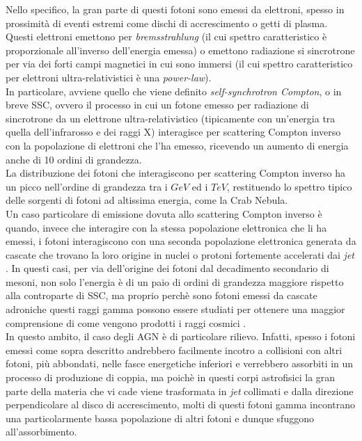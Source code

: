 \documentclass[10pt]{article}
\begin{document}
Nello specifico, la gran parte di questi fotoni sono emessi da elettroni, spesso in prossimità di eventi estremi come dischi di accrescimento o getti di plasma. Questi elettroni emettono per \textit{bremsstrahlung} (il cui spettro caratteristico è proporzionale all'inverso dell'energia emessa) o emettono radiazione si sincrotrone per via dei forti campi magnetici in cui sono immersi (il cui spettro caratteristico per elettroni ultra-relativistici è una \textit{power-law}).
\\
In particolare, avviene quello che viene definito \textit{self-synchrotron Compton}, o in breve SSC, ovvero il processo in cui un fotone emesso per radiazione di sincrotrone da un elettrone ultra-relativistico (tipicamente con un'energia tra quella dell'infrarosso e dei raggi X) interagisce per scattering Compton inverso con la popolazione di elettroni che l'ha emesso, ricevendo un aumento di energia anche di 10 ordini di grandezza.
\\
La distribuzione dei fotoni che interagiscono per scattering Compton inverso ha un picco nell'ordine di grandezza tra i $ \unit{GeV} $ ed i $ \unit{TeV} $, restituendo lo spettro tipico delle sorgenti di fotoni ad altissima energia, come la Crab Nebula.
\\
Un caso particolare di emissione dovuta allo scattering Compton inverso è quando, invece che interagire con la stessa popolazione elettronica che li ha emessi, i fotoni interagiscono con una seconda popolazione elettronica generata da cascate che trovano la loro origine in nuclei o protoni fortemente accelerati dai \textit{jet} \cite{grBLLAC}.
In questi casi, per via dell'origine dei fotoni dal decadimento secondario di mesoni, non solo l'energia è di un paio di ordini di grandezza maggiore rispetto alla controparte di SSC, ma proprio perchè sono fotoni emessi da cascate adroniche questi raggi gamma possono essere studiati per ottenere una maggior comprensione di come vengono prodotti i raggi cosmici \cite{VHEGA}.
\\
In questo ambito, il caso degli AGN è di particolare rilievo. Infatti, spesso i fotoni emessi come sopra descritto andrebbero facilmente incotro a collisioni con altri fotoni, più abbondati, nelle fasce energetiche inferiori e verrebbero assorbiti in un processo di produzione di coppia, ma poichè in questi corpi astrofisici la gran parte della materia che vi cade viene trasformata in \textit{jet} collimati e dalla direzione perpendicolare al disco di accrescimento, molti di questi fotoni gamma incontrano una particolarmente bassa popolazione di altri fotoni e dunque sfuggono all'assorbimento.
\\
\end{document}
